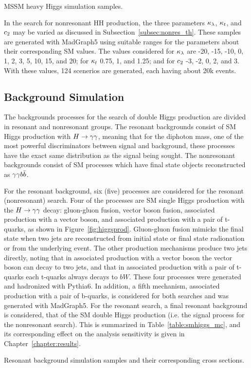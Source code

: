 \begin{table}[ht]
  \centering
  \renewcommand{\arraystretch}{1.4}
  \caption{MSSM heavy Higgs simulation samples.}
  
  \label{table:mssm_mc}
\end{table}

In the search for nonresonant HH production, the three parameters $\kappa_{\lambda}$, $\kappa_{t}$, and $c_2$
may be varied as discussed in Subsection~\ref{subsec:nonres_th}. These samples are generated
with MadGraph5 using suitable ranges for the parameters about their corresponding SM values. The
values considered for $\kappa_{\lambda}$ are -20, -15, -10, 0, 1, 2, 3, 5, 10, 15, and 20; for $\kappa_{t}$ 0.75, 1, and 1.25; and for $c_2$ -3, -2, 0, 2, and 3.
With these values, 124 scenerios are generated, each having about 20k events.

\subsection{Background Simulation\label{subsec:bkg_samples}}

The backgrounds processes for the search of double Higgs production are divided in resonant and
nonresonant groups. The resonant backgrounds consist of SM Higgs production with $H\to\gamma\gamma$, meaning
that for the diphoton mass, one of the most powerful discriminators between signal and background,
these processes have the exact same distribution as the signal being sought. The nonresonant backgrounds
consist of SM processes which have final state objects reconstructed as $\gamma\gamma b\bar{b}$.

For the resonant background, six (five) processes are considered for the resonant (nonresonant) search.
Four of the processes are SM single Higgs production with the $H\to\gamma\gamma$ decay: gluon-gluon fusion, vector
boson fusion, associated production with a vector boson, and associated production with a pair of
t-quarks, as shown in Figure~\ref{fig:higgsprod}. Gluon-gluon fusion mimicks the final state when two
jets are reconstructed from initial state or final state radionation or from the underlying event.
The other production mechanisms produce two jets directly,
noting that in associated production with a vector boson the vector boson can decay to two jets, and
that in associated production with a pair of t-quarks each t-quarks always decays to $bW$.
These four processes were generated and hadronized with Pythia6.
In addition, a fifth mechanism, associated production with a pair of b-quarks, is considered for
both searches and was generated with MadGraph5.
For the resonant search, a final resonant background is considered, that of the
SM double Higgs production (i.e. the signal process for the nonresonant search).
This is summarized in Table~\ref{table:smhiggs_mc}, and its corresponding effect on the analysis
sensitivity is given in Chapter~\ref{chapter:results}.

\begin{table}[ht]
  \centering
  \renewcommand{\arraystretch}{1.4}
  \caption{Resonant background simulation samples and their corresponding cross sections.}
  
  \label{table:smhiggs_mc}
\end{table}

